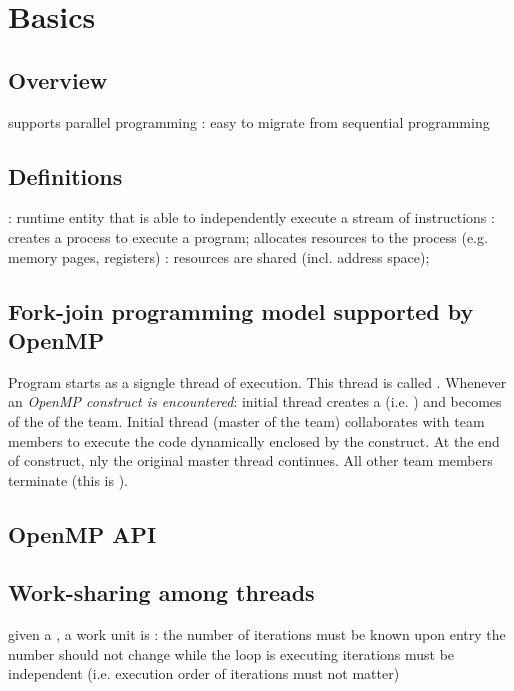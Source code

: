 \documentclass{myproc}
\begin{document}
\small
{}

\tableofcontents

\section{Basics}
\subsection{Overview}
\bit
\w supports  parallel programming
\w {}: easy to migrate from sequential programming
\eit

\subsection{Definitions}
\bit
\w {}: runtime entity that is able to independently execute a stream
of instructions
\w {}: creates a process to execute a program; allocates resources to the
process (e.g. memory pages, registers)
\w {}: resources are shared (incl. address space); 
\eit

\subsection{Fork-join programming model supported by OpenMP}
\bit
\w Program starts as a signgle thread of execution. This thread is called
.
\w Whenever an {\em OpenMP construct is encountered}: initial thread creates a
 (i.e. ) and becomes of the  of the
team.
\w Initial thread (master of the team) collaborates with team members to
execute the code dynamically enclosed by the construct.
\w At the end of construct, nly the original master thread continues. All
other team members terminate (this is ). 
\eit

\subsection{OpenMP API}
\bit
\w {}
\w {}
\w {}
\eit

\subsection{Work-sharing among threads}
\bit
\w given a , a work unit is 
\w {}:
   \bit
   \w the number of iterations must be known upon entry
   \w the number should not change while the loop is executing
   \w iterations must be independent (i.e. execution order of iterations must
   not matter)
   \eit
\eit
\end{document}
